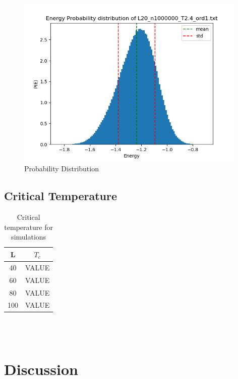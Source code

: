 \documentclass{article}
\begin{document}
\begin{figure}[ht]
    \centering
    \includegraphics[width = 11cm]{img/energyhistogram_L20_n1000000_T24_ord1.png}
    \caption{Probability Distribution}
    \label{fig:prob-highT-ord1}
  \end{figure}

\subsection{Critical Temperature}

  \begin{table}[ht]
    \centering
    \caption{Critical temperature for simulations}
    \vspace{2mm}
    \label{tab:criticaltemperature}
    \begin{tabular}{|c|c|}
        \hline
         L & $T_c$\\
        \hline \hline
        40 & VALUE \\
        60 & VALUE \\
        80 & VALUE \\
        100 & VALUE \\
        \hline
    \end{tabular} \\
    \hspace{0pt}\\
  \end{table}

\vspace{1cm}

\clearpage
\newpage

\section{Discussion} \label{sec:Discussion}
\end{document}
